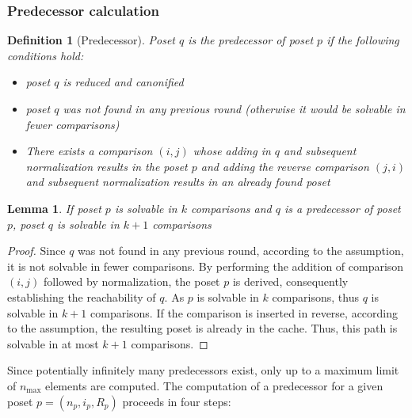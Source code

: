 \documentclass[10pt,journal,compsoc]{IEEEtran}
\newtheorem{lemma}{Lemma}
\newtheorem{definition}{Definition}
\begin{document}
\subsubsection{Predecessor calculation} \label{sec:backward:predecessor_calculation}

\begin{definition}[Predecessor] \label{definition:predecessor_calculation}
  Poset $q$ is the predecessor of poset $p$ if the following conditions hold:
  \begin{itemize}
    \item poset $q$ is reduced and canonified
    \item poset $q$ was not found in any previous round (otherwise it would be solvable in fewer comparisons)
    \item There exists a comparison $(i, j)$ whose adding in $q$ and subsequent normalization results in the poset $p$ and adding the reverse comparison $(j, i)$ and subsequent normalization results in an already found poset
  \end{itemize}
\end{definition}

\begin{lemma} \label{lemma:predecessor_calculation}
  If poset $p$ is solvable in $k$ comparisons and $q$ is a predecessor of poset $p$, poset $q$ is solvable in $k + 1$ comparisons
\end{lemma}

\begin{proof} \label{proof:predecessor_calculation}
  Since $q$ was not found in any previous round, according to the assumption, it is not solvable in fewer comparisons.
  By performing the addition of comparison $(i, j)$ followed by normalization, the poset $p$ is derived, consequently establishing the reachability of $q$.
  As $p$ is solvable in $k$ comparisons, thus $q$ is solvable in $k + 1$ comparisons.
  If the comparison is inserted in reverse, according to the assumption, the resulting poset is already in the cache.
  Thus, this path is solvable in at most $k + 1$ comparisons.
\end{proof}

Since potentially infinitely many predecessors exist, only up to a maximum limit of $n_{\text{max}}$ elements are computed.
The computation of a predecessor for a given poset $p = (n_p, i_p, R_p)$ proceeds in four steps:
\end{document}
